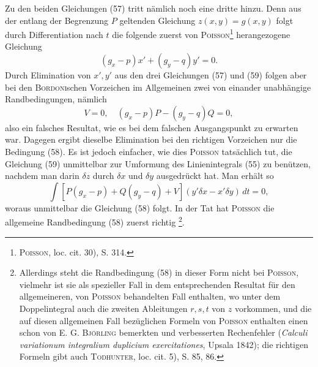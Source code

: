 Zu den beiden Gleichungen (57) tritt nämlich noch eine dritte hinzu.
\clearpage{}
\noindent Denn aus der entlang der Begrenzung $P$ geltenden Gleichung $z(x,y)=g(x,y)$
folgt durch Differentiation nach $t$ die folgende zuerst von \textsc{Poisson}\footnote{\textsc{Poisson}, loc. cit. 30), S. 314.} herangezogene
Gleichung
\begin{equation*}
(g_x-p)x'+(g_y-q)y'=0.\tag{59}
\end{equation*}
Durch Elimination von $x',y'$ aus den drei Gleichungen (57) und (59) folgen
aber bei den \textsc{Bordoni}schen Vorzeichen im Allgemeinen zwei von einander
unabhängige Randbedingungen, nämlich
\[
V=0,\quad(g_x-p)P-(g_y-q)Q=0,
\]
also ein falsches Resultat, wie es bei dem falschen Ausgangspunkt zu erwarten
war. Dagegen ergibt dieselbe Elimination bei den richtigen Vorzeichen nur
die  Bedingung (58). Es ist jedoch einfacher, wie dies \textsc{Poisson} tatsächlich
tut, die Gleichung (59) unmittelbar zur Umformung des Linienintegrals (55)
zu benützen, nachdem man darin $\delta z$ durch $\delta x$ und $\delta y$ ausgedrückt hat. Man
erhält so
\[
\int[P(g_x-p)+Q(g_y-q)+V](y'\delta x-x'\delta y)\,dt=0,
\]
woraus unmittelbar die Gleichung (58) folgt. In der Tat hat \textsc{Poisson} die allgemeine
Randbedingung (58) zuerst richtig \footnote{Allerdings steht die Randbedingung (58) in dieser Form nicht bei \textsc{Poisson}, vielmehr ist sie als
spezieller Fall in dem entsprechenden Resultat für den allgemeineren, von \textsc{Poisson} behandelten Fall enthalten,
wo unter dem Doppelintegral auch die zweiten Ableitungen $r,s,t$ von $z$ vorkommen, und die auf
diesen allgemeinen Fall bezüglichen Formeln von \textsc{Poisson} enthalten einen schon von E. G. \textsc{Björling} bemerkten
und verbesserten Rechenfehler (\textit{Calculi variationum integralium duplicium exercitationes}, Upsala 1842); die
richtigen Formeln gibt auch \textsc{Todhunter}, loc. cit. 5), S. 85, 86.}.

